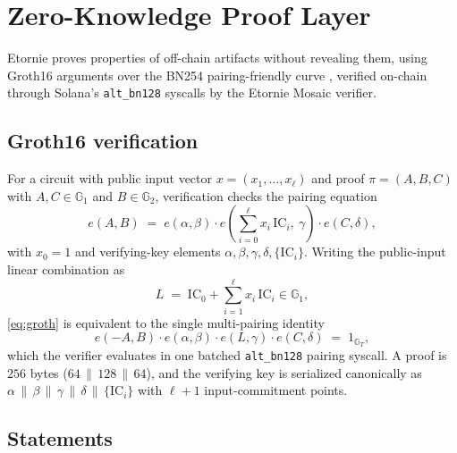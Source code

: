 \documentclass[conference]{IEEEtran}
\begin{document}
\section{Zero-Knowledge Proof Layer}
\label{sec:zk}

Etornie proves properties of off-chain artifacts without revealing them,
using Groth16 arguments \cite{groth16} over the BN254 pairing-friendly curve
\cite{bn254}, verified on-chain through Solana's \texttt{alt\_bn128}
syscalls by the Etornie Mosaic verifier.

\subsection{Groth16 verification}

For a circuit with public input vector $x = (x_1, \ldots, x_\ell)$ and proof
$\pi = (A, B, C)$ with $A, C \in \mathbb{G}_1$ and $B \in \mathbb{G}_2$,
verification checks the pairing equation
\begin{equation}
e(A, B) \;=\; e(\alpha, \beta)\cdot e\!\left(\sum_{i=0}^{\ell} x_i\,
\mathrm{IC}_i,\ \gamma\right)\cdot e(C, \delta),
\label{eq:groth}
\end{equation}
with $x_0 = 1$ and verifying-key elements $\alpha, \beta, \gamma, \delta,
\{\mathrm{IC}_i\}$. Writing the public-input linear combination as
\begin{equation}
L \;=\; \mathrm{IC}_0 + \sum_{i=1}^{\ell} x_i\, \mathrm{IC}_i \in \mathbb{G}_1,
\end{equation}
\eqref{eq:groth} is equivalent to the single multi-pairing identity
\begin{equation}
e(-A, B)\cdot e(\alpha, \beta)\cdot e(L, \gamma)\cdot e(C, \delta)
\;=\; 1_{\mathbb{G}_T},
\label{eq:multipair}
\end{equation}
which the verifier evaluates in one batched \texttt{alt\_bn128} pairing
syscall. A proof is $256$ bytes ($64\,\|\,128\,\|\,64$), and the verifying key
is serialized canonically as
$\alpha\,\|\,\beta\,\|\,\gamma\,\|\,\delta\,\|\,\{\mathrm{IC}_i\}$ with
$\ell + 1$ input-commitment points.

\subsection{Statements}
\end{document}

